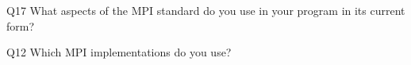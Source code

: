 \begin{description}%
\item{Q17} What aspects of the MPI standard do you use in your program in its current form?%
\item{Q12} Which MPI implementations do you use?%
\end{description}%
